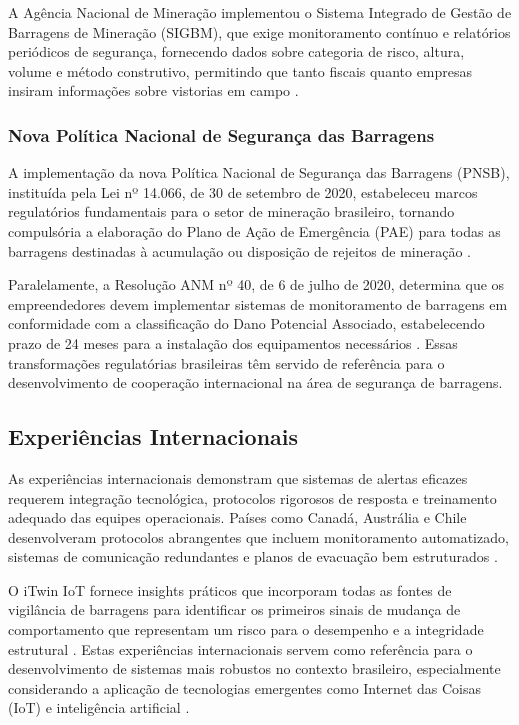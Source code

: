 A Agência Nacional de Mineração implementou o Sistema Integrado de Gestão de Barragens de Mineração (SIGBM), que exige monitoramento contínuo e relatórios periódicos de segurança, fornecendo dados sobre categoria de risco, altura, volume e método construtivo, permitindo que tanto fiscais quanto empresas insiram informações sobre vistorias em campo \cite{anm2020sistema}.

\subsubsection{Nova Política Nacional de Segurança das Barragens}

A implementação da nova Política Nacional de Segurança das Barragens (PNSB), instituída pela Lei nº 14.066, de 30 de setembro de 2020, estabeleceu marcos regulatórios fundamentais para o setor de mineração brasileiro, tornando compulsória a elaboração do Plano de Ação de Emergência (PAE) para todas as barragens destinadas à acumulação ou disposição de rejeitos de mineração \cite{brasil2020lei14066}.

Paralelamente, a Resolução ANM nº 40, de 6 de julho de 2020, determina que os empreendedores devem implementar sistemas de monitoramento de barragens em conformidade com a classificação do Dano Potencial Associado, estabelecendo prazo de 24 meses para a instalação dos equipamentos necessários \cite{anm2021resolucao56}. Essas transformações regulatórias brasileiras têm servido de referência para o desenvolvimento de cooperação internacional na área de segurança de barragens.

\subsection{Experiências Internacionais}

As experiências internacionais demonstram que sistemas de alertas eficazes requerem integração tecnológica, protocolos rigorosos de resposta e treinamento adequado das equipes operacionais. Países como Canadá, Austrália e Chile desenvolveram protocolos abrangentes que incluem monitoramento automatizado, sistemas de comunicação redundantes e planos de evacuação bem estruturados \cite{bentley2025solucoes}.

O iTwin IoT fornece insights práticos que incorporam todas as fontes de vigilância de barragens para identificar os primeiros sinais de mudança de comportamento que representam um risco para o desempenho e a integridade estrutural \cite{bentley2025solucoes}. Estas experiências internacionais servem como referência para o desenvolvimento de sistemas mais robustos no contexto brasileiro, especialmente considerando a aplicação de tecnologias emergentes como Internet das Coisas (IoT) e inteligência artificial \cite{ascenty2024aiot}.

